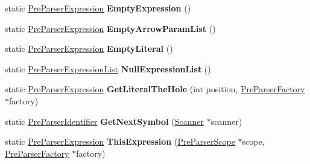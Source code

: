 \begin{DoxyCompactItemize}
\item 
\hypertarget{classv8_1_1internal_1_1_pre_parser_traits_aa87841c51f003fe9b8c020a49ddfe672}{}static \hyperlink{classv8_1_1internal_1_1_pre_parser_expression}{Pre\+Parser\+Expression} {\bfseries Empty\+Expression} ()\label{classv8_1_1internal_1_1_pre_parser_traits_aa87841c51f003fe9b8c020a49ddfe672}

\item 
\hypertarget{classv8_1_1internal_1_1_pre_parser_traits_a50b09a0713d007ebdc603ee68dad534b}{}static \hyperlink{classv8_1_1internal_1_1_pre_parser_expression}{Pre\+Parser\+Expression} {\bfseries Empty\+Arrow\+Param\+List} ()\label{classv8_1_1internal_1_1_pre_parser_traits_a50b09a0713d007ebdc603ee68dad534b}

\item 
\hypertarget{classv8_1_1internal_1_1_pre_parser_traits_a00363fbe43336e636176910c3c87f348}{}static \hyperlink{classv8_1_1internal_1_1_pre_parser_expression}{Pre\+Parser\+Expression} {\bfseries Empty\+Literal} ()\label{classv8_1_1internal_1_1_pre_parser_traits_a00363fbe43336e636176910c3c87f348}

\item 
\hypertarget{classv8_1_1internal_1_1_pre_parser_traits_ab9e866cd9f5e668838fbd12546a1a5fe}{}static \hyperlink{classv8_1_1internal_1_1_pre_parser_expression_list}{Pre\+Parser\+Expression\+List} {\bfseries Null\+Expression\+List} ()\label{classv8_1_1internal_1_1_pre_parser_traits_ab9e866cd9f5e668838fbd12546a1a5fe}

\item 
\hypertarget{classv8_1_1internal_1_1_pre_parser_traits_a8d1bf1dc2bbcb07c3e965aecab84d66c}{}static \hyperlink{classv8_1_1internal_1_1_pre_parser_expression}{Pre\+Parser\+Expression} {\bfseries Get\+Literal\+The\+Hole} (int position, \hyperlink{classv8_1_1internal_1_1_pre_parser_factory}{Pre\+Parser\+Factory} $\ast$factory)\label{classv8_1_1internal_1_1_pre_parser_traits_a8d1bf1dc2bbcb07c3e965aecab84d66c}

\item 
\hypertarget{classv8_1_1internal_1_1_pre_parser_traits_a1ac8d99696da0496bea8d444ec1af505}{}static \hyperlink{classv8_1_1internal_1_1_pre_parser_identifier}{Pre\+Parser\+Identifier} {\bfseries Get\+Next\+Symbol} (\hyperlink{classv8_1_1internal_1_1_scanner}{Scanner} $\ast$scanner)\label{classv8_1_1internal_1_1_pre_parser_traits_a1ac8d99696da0496bea8d444ec1af505}

\item 
\hypertarget{classv8_1_1internal_1_1_pre_parser_traits_a5b15887437f4d4beef4801ac6c53526e}{}static \hyperlink{classv8_1_1internal_1_1_pre_parser_expression}{Pre\+Parser\+Expression} {\bfseries This\+Expression} (\hyperlink{classv8_1_1internal_1_1_pre_parser_scope}{Pre\+Parser\+Scope} $\ast$scope, \hyperlink{classv8_1_1internal_1_1_pre_parser_factory}{Pre\+Parser\+Factory} $\ast$factory)\label{classv8_1_1internal_1_1_pre_parser_traits_a5b15887437f4d4beef4801ac6c53526e}


\end{DoxyCompactItemize}
